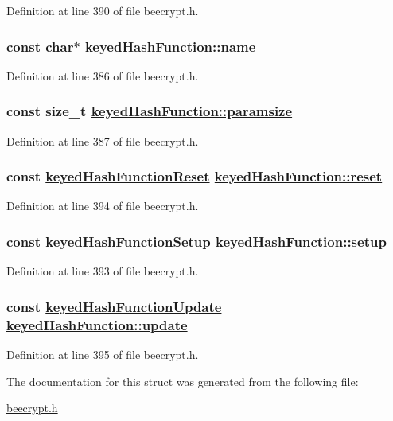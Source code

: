 Definition at line 390 of file beecrypt.h.\hypertarget{structkeyedHashFunction_o0}{
\subsubsection[name]{\setlength{\rightskip}{0pt plus 5cm}const char$\ast$ \hyperlink{structkeyedHashFunction_o0}{keyed\-Hash\-Function::name}}}
\label{structkeyedHashFunction_o0}


Definition at line 386 of file beecrypt.h.\hypertarget{structkeyedHashFunction_o1}{
\subsubsection[paramsize]{\setlength{\rightskip}{0pt plus 5cm}const size\_\-t \hyperlink{structkeyedHashFunction_o1}{keyed\-Hash\-Function::paramsize}}}
\label{structkeyedHashFunction_o1}


Definition at line 387 of file beecrypt.h.\hypertarget{structkeyedHashFunction_o8}{
\subsubsection[reset]{\setlength{\rightskip}{0pt plus 5cm}const \hyperlink{beecrypt_8h_a12}{keyed\-Hash\-Function\-Reset} \hyperlink{structkeyedHashFunction_o8}{keyed\-Hash\-Function::reset}}}
\label{structkeyedHashFunction_o8}


Definition at line 394 of file beecrypt.h.\hypertarget{structkeyedHashFunction_o7}{
\subsubsection[setup]{\setlength{\rightskip}{0pt plus 5cm}const \hyperlink{beecrypt_8h_a11}{keyed\-Hash\-Function\-Setup} \hyperlink{structkeyedHashFunction_o7}{keyed\-Hash\-Function::setup}}}
\label{structkeyedHashFunction_o7}


Definition at line 393 of file beecrypt.h.\hypertarget{structkeyedHashFunction_o9}{
\subsubsection[update]{\setlength{\rightskip}{0pt plus 5cm}const \hyperlink{beecrypt_8h_a13}{keyed\-Hash\-Function\-Update} \hyperlink{structkeyedHashFunction_o9}{keyed\-Hash\-Function::update}}}
\label{structkeyedHashFunction_o9}


Definition at line 395 of file beecrypt.h.

The documentation for this struct was generated from the following file:\begin{CompactItemize}
\item 
\hyperlink{beecrypt_8h}{beecrypt.h}\end{CompactItemize}
